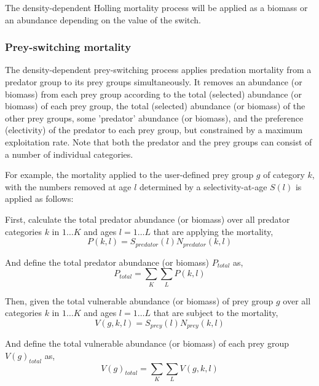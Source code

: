 The density-dependent Holling mortality process will be applied as a biomass or an abundance depending on the value of the  switch.

\subsubsection*{Prey-switching mortality}

The density-dependent prey-switching process applies predation mortality from a predator group to its prey groups simultaneously. It removes an abundance (or biomass) from each prey group according to the total (selected) abundance (or biomass) of each prey group, the total (selected) abundance (or biomass) of the other prey groups, some 'predator' abundance (or biomass), and the preference (electivity) of the predator to each prey group, but constrained by a maximum exploitation rate. Note that both the predator and the prey groups can consist of a number of individual categories.

For example, the mortality applied to the user-defined prey group $g$ of category $k$, with the numbers removed at age $l$ determined by a selectivity-at-age $S(l)$ is applied as follows:

First, calculate the total predator abundance (or biomass) over all predator categories $k$ in $1 \ldots K$ and ages $l = 1 \ldots L$ that are applying the mortality,
\begin{equation}
  P(k,l) = S_{predator}(l) N_{predator}(k,l)
\end{equation}

And define the total predator abundance (or biomass) $P_{total}$ as,
\begin{equation}
  P_{total}  = \sum\limits_K {\sum\limits_L {P(k,l)}} 
\end{equation}

Then, given the total vulnerable abundance (or biomass) of prey group $g$ over all categories $k$ in $1 \ldots K$ and ages $l = 1 \ldots L$ that are subject to the mortality,
\begin{equation}
  V(g,k,l) = S_{prey}(l) N_{prey}(k,l)
\end{equation}

And define the total vulnerable abundance (or biomass) of each prey group $V(g)_{total}$ as,
\begin{equation}
  V(g)_{total}  = \sum\limits_K {\sum\limits_L {V(g,k,l)}} 
\end{equation}

